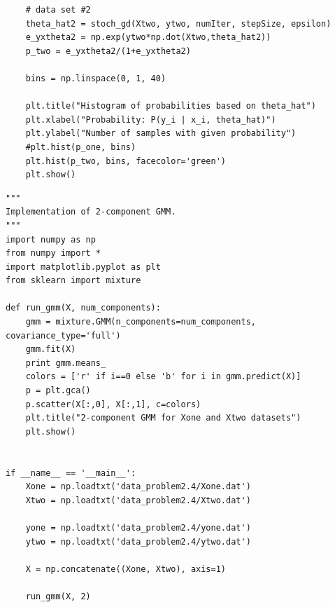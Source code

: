 \documentclass[11pt]{article}
\begin{document}
\begin{lstlisting}
    # data set #2
    theta_hat2 = stoch_gd(Xtwo, ytwo, numIter, stepSize, epsilon)
    e_yxtheta2 = np.exp(ytwo*np.dot(Xtwo,theta_hat2))
    p_two = e_yxtheta2/(1+e_yxtheta2)

    bins = np.linspace(0, 1, 40)

    plt.title("Histogram of probabilities based on theta_hat")
    plt.xlabel("Probability: P(y_i | x_i, theta_hat)")
    plt.ylabel("Number of samples with given probability")
    #plt.hist(p_one, bins)
    plt.hist(p_two, bins, facecolor='green')
    plt.show()

\end{lstlisting}

\begin{lstlisting}
"""
Implementation of 2-component GMM.
"""
import numpy as np
from numpy import *
import matplotlib.pyplot as plt
from sklearn import mixture

def run_gmm(X, num_components):
    gmm = mixture.GMM(n_components=num_components, covariance_type='full')
    gmm.fit(X)
    print gmm.means_
    colors = ['r' if i==0 else 'b' for i in gmm.predict(X)]
    p = plt.gca()
    p.scatter(X[:,0], X[:,1], c=colors)
    plt.title("2-component GMM for Xone and Xtwo datasets")
    plt.show()


if __name__ == '__main__':
    Xone = np.loadtxt('data_problem2.4/Xone.dat')
    Xtwo = np.loadtxt('data_problem2.4/Xtwo.dat')

    yone = np.loadtxt('data_problem2.4/yone.dat')
    ytwo = np.loadtxt('data_problem2.4/ytwo.dat')

    X = np.concatenate((Xone, Xtwo), axis=1)

    run_gmm(X, 2)
\end{lstlisting}
\end{document}
